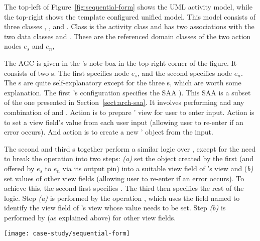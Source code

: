 The top-left of Figure~\ref{fig:sequential-form} shows the UML activity model, while the top-right shows the template configured unified model.
This model consists of three classes , , and . Class  is the activity class and has two associations with the two data classes  and . These are the referenced domain classes of the two action nodes $ e_s $ and $ e_n $, \resp

The AGC is given in the 's note box in the top-right corner of the figure. It consists of two s. The first  specifies node $ e_s $, and the second specifies node $ e_n $. The s are quite self-explanatory except for the three s, which are worth some explanation. The first 's configuration specifies the SAA ). This SAA is a subset of the one presented in Section~\ref{sect:arch-saa}. It involves performing  and any combination of  and . Action  is to prepare ' view for user to enter input. Action  is to set a view field's value from each user input (allowing user to re-enter if an error occurs). And action  is to create a new ' object from the input.

The second and third s together perform a similar logic over , except for the need to break the  operation into two steps: \textit{(a)} set the  object created by the first  (and offered by $ e_s $ to $ e_n $ via its output pin) into a suitable view field of 's view and (\textit{b)} set values of other view fields (allowing user to re-enter if an error occurs). To achieve this, the second  first specifies . The third  then specifies the rest of the logic. Step \textit{(a)} is performed by the operation , which uses the field named  to identify the view field of 's view whose value needs to be set. Step \textit{(b)} is performed by  (as explained above) for other view fields.

\begin{figure*}[ht]
	\begin{center}
		\texttt{[image: case-study/sequential-form]}
	\end{center}
	\caption{The sequential pattern form.} %
	\label{fig:sequential-form}
\end{figure*}

